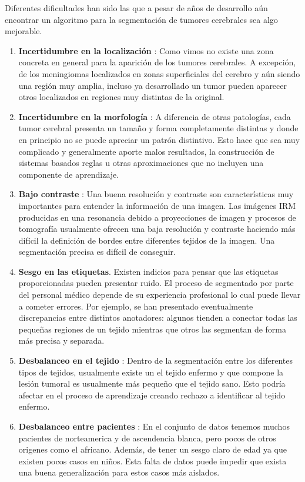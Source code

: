 Diferentes dificultades han sido las que a pesar de años de desarrollo aún encontrar un algoritmo para la segmentación de tumores cerebrales sea algo mejorable. 

\begin{enumerate}
	\item \textbf{Incertidumbre en la localización} : Como vimos no existe una zona concreta en general para la aparición de los tumores cerebrales. A excepción, de los meningiomas localizados en zonas superficiales del cerebro y aún siendo una región muy amplia, incluso ya desarrollado un tumor pueden aparecer otros localizados en regiones muy distintas de la original. 
	\item \textbf{Incertidumbre en la morfología} : A diferencia de otras patologías, cada tumor cerebral presenta un tamaño y forma completamente distintas y donde en principio no se puede apreciar un patrón distintivo. Esto hace que sea muy complicado y generalmente aporte malos resultados, la construcción de sistemas basados reglas u otras aproximaciones que no incluyen una componente de aprendizaje.
	
	\item \textbf{Bajo contraste} : Una buena resolución y contraste son características muy importantes para entender la información de una imagen. Las imágenes IRM producidas en una resonancia debido a proyecciones de imagen y procesos de tomografía usualmente ofrecen una baja resolución y contraste haciendo más difícil la definición de bordes entre diferentes tejidos de la imagen. Una segmentación precisa es difícil de conseguir.
	
	\item \textbf{Sesgo en las etiquetas}. Existen indicios para pensar que las etiquetas proporcionadas pueden presentar ruido. El proceso de segmentado por parte del personal médico 
	depende de su experiencia profesional lo cual puede llevar a cometer errores. Por ejemplo, se han presentado eventualmente discrepancias entre distintos anotadores: algunos tienden a conectar todas las pequeñas regiones de un tejido mientras que otros las segmentan de forma más precisa y separada. 
	
	\item \textbf{Desbalanceo en el tejido} : Dentro de la segmentación entre los diferentes tipos de tejidos, usualmente existe un el tejido enfermo y que compone la lesión tumoral es usualmente más pequeño que el tejido sano. Esto podría afectar en el proceso de aprendizaje creando rechazo a identificar al tejido enfermo. 
	
	\item \textbf{Desbalanceo entre pacientes} : En el conjunto de datos tenemos muchos pacientes de norteamerica y de ascendencia blanca, pero pocos de otros origenes como el africano. Además, de tener un sesgo claro de edad ya que existen pocos casos en niños. Esta falta de datos puede impedir que exista una buena generalización para estos casos más aislados.
	
\end{enumerate}


